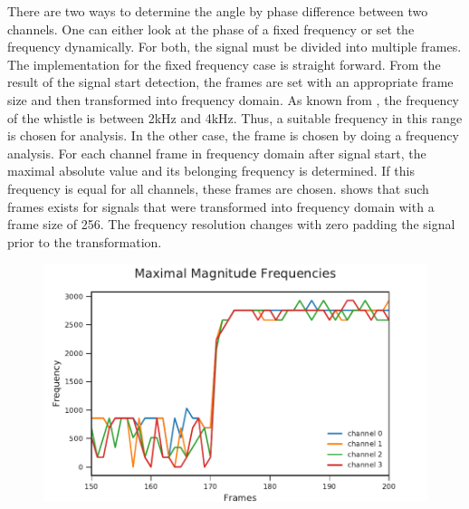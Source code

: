 There are two ways to determine the angle by phase difference
between two channels.
One can either look at the phase of a fixed frequency or set the frequency
dynamically.
For both, the signal must be divided into multiple frames.
The implementation for the fixed frequency case is straight forward.
From the result of the signal start detection, the frames
are set with an appropriate frame size and then transformed into
frequency domain.
As known from \cite{Hasselbring}, the frequency of the whistle is between 2\si{\kilo\hertz}
and 4\si{\kilo\hertz}.
Thus, a suitable frequency in this range is chosen for analysis.
In the other case, the frame is chosen by doing a
frequency analysis.
For each channel frame in frequency domain after signal start,
the maximal absolute value and its belonging frequency is determined.
If this frequency is equal for all channels, these frames
are chosen.
 shows that such frames exists for signals that
were transformed into frequency domain with a frame size of 256.
The frequency resolution changes with zero padding the signal prior
to the transformation.
\begin{figure}[ht]
	\centering
		\includegraphics[]{figures/maxFreq}
	\caption{}
    \label{fig:03_maxFreq}
\end{figure}

